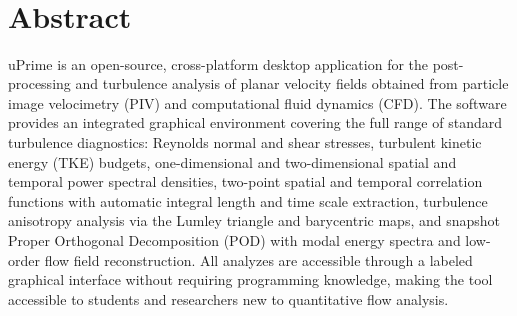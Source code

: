 \documentclass[11pt, a4paper]{report}
\newcommand{\software}[1]{\textsf{#1}}
\begin{document}
\begin{titlepage}
\begin{flushleft}
  \\[0.15cm]
  \hspace{2mm}{\small\textcolor{upgray}{Transient Fluid Mechanics Laboratory (PI: Omri Ram)}}\\[0.05cm]
  \hspace{2mm}{\small\textcolor{upgray}{Faculty of Mechanical Engineering, Technion}}\\[0.05cm]
  \hspace{2mm}{\small\textcolor{upgray}{Israel Institute of Technology, Haifa}}\\[0.5cm]
  \\[0.2cm]
  \\[0.3cm]
  \hspace{2mm}{\small\textcolor{upgray}{Open source\quad$\cdot$\quad GNU GPL v3\quad$\cdot$\quad 2026}}
\end{flushleft}

\vspace{0.4cm}
\noindent\colorbox{upblue}{\rule{0pt}{5pt}\hspace{\dimexpr\textwidth+2\fboxsep\relax}}
\end{titlepage}

\clearpage
\thispagestyle{empty}

\section*{Abstract}

\software{uPrime} is an open-source, cross-platform desktop application for the post-processing and turbulence analysis of planar velocity fields obtained from particle image velocimetry (PIV) and computational fluid dynamics (CFD). The software provides an integrated graphical environment covering the full range of standard turbulence diagnostics: Reynolds normal and shear stresses, turbulent kinetic energy (TKE) budgets, one-dimensional and two-dimensional spatial and temporal power spectral densities, two-point spatial and temporal correlation functions with automatic integral length and time scale extraction, turbulence anisotropy analysis via the Lumley triangle and barycentric maps, and snapshot Proper Orthogonal Decomposition (POD) with modal energy spectra and low-order flow field reconstruction. All analyzes are accessible through a labeled graphical interface without requiring programming knowledge, making the tool accessible to students and researchers new to quantitative flow analysis.
\end{document}
